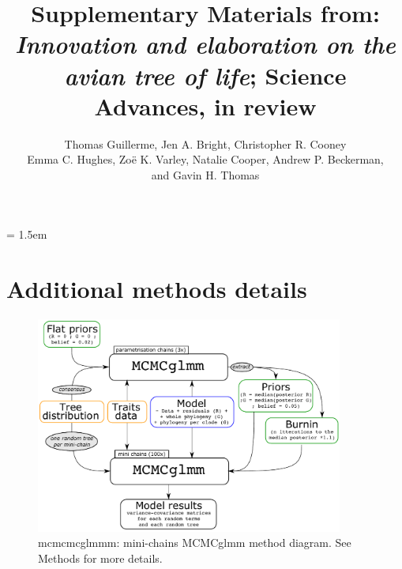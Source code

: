 \documentclass[12pt,a4paper]{article}
\title{Supplementary Materials from: \textit{Innovation and elaboration on the avian tree of life}; Science Advances, in review}
\author{Thomas Guillerme, 
Jen A. Bright,
Christopher R. Cooney\\
Emma C. Hughes,
Zo\"{e} K. Varley,
Natalie Cooper,
Andrew P. Beckerman,\\
and Gavin H. Thomas}
\date{}
\begin{document}
\maketitle

\tableofcontents

\parindent = 1.5em
\addtolength{\parskip}{.3em}


\newpage 

%
%

\section{Additional methods details}

\begin{figure}[H]
\centering
   \includegraphics[width=0.9\textwidth]{Figures/mini-chains_diagram.pdf}
\caption{mcmcmcglmmm: mini-chains MCMCglmm method diagram. See Methods for more details.}
\label{Fig:mcmcmcglmm}
\end{figure}

\newpage
\end{document}
